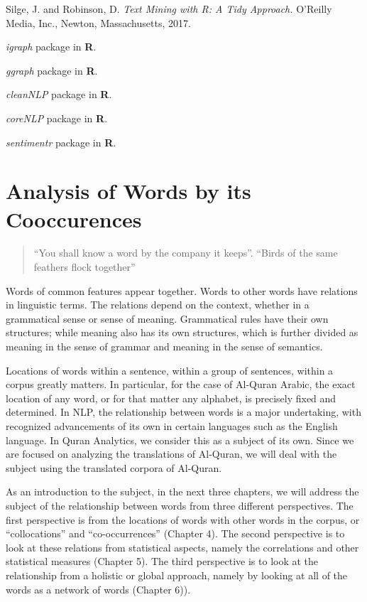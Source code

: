 \documentclass[
]{article}
\begin{document}
Silge, J. and Robinson, D. \emph{Text Mining with R: A Tidy Approach.} O'Reilly Media, Inc., Newton, Massachusetts, 2017. \citep{silge2017}

\emph{igraph} package in \textbf{R}. \citep{igraph}

\emph{ggraph} package in \textbf{R}. \citep{ggraph}

\emph{cleanNLP} package in \textbf{R}. \citep{cleanNLP}

\emph{coreNLP} package in \textbf{R}. \citep{coreNLP}

\emph{sentimentr} package in \textbf{R}. \citep{sentimentr}

\hypertarget{analysis-of-words-by-its-cooccurences}{%
\section*{Analysis of Words by its Cooccurences}\label{analysis-of-words-by-its-cooccurences}}

\begin{quote}
``You shall know a word by the company it keeps''.
``Birds of the same feathers flock together''
\end{quote}

Words of common features appear together. Words to other words have relations in linguistic terms. The relations depend on the context, whether in a grammatical sense or sense of meaning. Grammatical rules have their own structures; while meaning also has its own structures, which is further divided as meaning in the sense of grammar and meaning in the sense of semantics.

Locations of words within a sentence, within a group of sentences, within a corpus greatly matters. In particular, for the case of Al-Quran Arabic, the exact location of any word, or for that matter any alphabet, is precisely fixed and determined. In NLP, the relationship between words is a major undertaking, with recognized advancements of its own in certain languages such as the English language. In Quran Analytics, we consider this as a subject of its own. Since we are focused on analyzing the translations of Al-Quran, we will deal with the subject using the translated corpora of Al-Quran.

As an introduction to the subject, in the next three chapters, we will address the subject of the relationship between words from three different perspectives. The first perspective is from the locations of words with other words in the corpus, or ``collocations'' and ``co-occurrences'' (Chapter 4). The second perspective is to look at these relations from statistical aspects, namely the correlations and other statistical measures (Chapter 5). The third perspective is to look at the relationship from a holistic or global approach, namely by looking at all of the words as a network of words (Chapter 6)).
\end{document}
